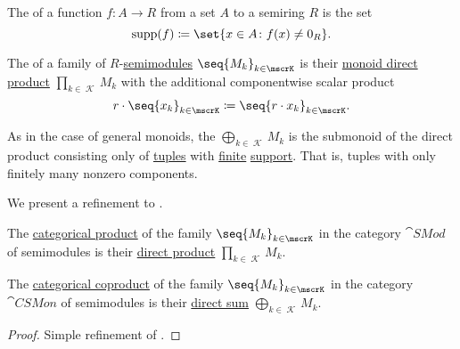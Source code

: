 \begin{definition}\label{def:function_support}
  The  of a function \( f: A \to R \) from a set \( A \) to a semiring \( R \) is the set
  \begin{equation*}
    \supp(f) \coloneqq \set{ x \in A \colon f(x) \neq 0_R }.
  \end{equation*}
\end{definition}

\begin{definition}\label{def:semimodule_direct_product}
  The  of a family of \( R \)-\hyperref[def:semimodule]{semimodules} \( \seq{ M_k }_{k \in \mscrK} \) is their \hyperref[def:monoid_direct_product]{monoid direct product} \( \prod_{k \in \mscrK} M_k \) with the additional componentwise scalar product
  \begin{equation*}
    r \cdot \seq{ x_k }_{k \in \mscrK}
    \coloneqq
    \seq{ r \cdot x_k }_{k \in \mscrK}.
  \end{equation*}

  As in the case of general monoids, the  \( \bigoplus_{k \in \mscrK} M_k \) is the submonoid of the direct product consisting only of \hyperref[def:cartesian_product/tuple]{tuples} with \hyperref[def:set_finiteness]{finite} \hyperref[def:function_support]{support}. That is, tuples with only finitely many nonzero components.
\end{definition}

\begin{proposition}\label{thm:semimodule_categorical_limits}
  We present a refinement to .

  \begin{thmenum}
     The \hyperref[def:discrete_category_limits]{categorical product} of the family \( \seq{ M_k }_{k \in \mscrK} \) in the category \hyperref[def:semimodule/category]{\( \cat{SMod} \)} of semimodules is their \hyperref[def:semimodule_direct_product]{direct product} \( \prod_{k \in \mscrK} M_k \).

     The \hyperref[def:discrete_category_limits]{categorical coproduct} of the family \( \seq{ M_k }_{k \in \mscrK} \) in the category \hyperref[def:semimodule/category]{\( \cat{CSMon} \)} of  semimodules is their \hyperref[def:semimodule_direct_product]{direct sum} \( \bigoplus_{k \in \mscrK} M_k \).
  \end{thmenum}
\end{proposition}
\begin{proof}
  Simple refinement of .
\end{proof}

